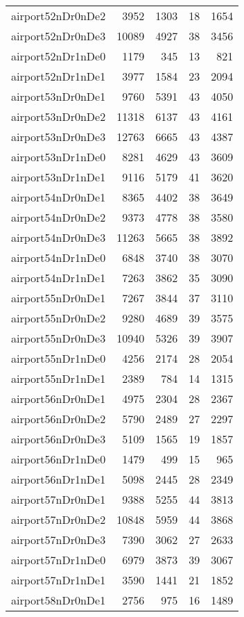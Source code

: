 \documentclass[../../../thesis.tex]{subfiles}
\begin{document}
\begin{longtable}{lrrrr}
airport52nDr0nDe2 & 3952 & 1303 & 18 & 1654 \\
airport52nDr0nDe3 & 10089 & 4927 & 38 & 3456 \\
airport52nDr1nDe0 & 1179 & 345 & 13 & 821 \\
airport52nDr1nDe1 & 3977 & 1584 & 23 & 2094 \\
airport53nDr0nDe1 & 9760 & 5391 & 43 & 4050 \\
airport53nDr0nDe2 & 11318 & 6137 & 43 & 4161 \\
airport53nDr0nDe3 & 12763 & 6665 & 43 & 4387 \\
airport53nDr1nDe0 & 8281 & 4629 & 43 & 3609 \\
airport53nDr1nDe1 & 9116 & 5179 & 41 & 3620 \\
airport54nDr0nDe1 & 8365 & 4402 & 38 & 3649 \\
airport54nDr0nDe2 & 9373 & 4778 & 38 & 3580 \\
airport54nDr0nDe3 & 11263 & 5665 & 38 & 3892 \\
airport54nDr1nDe0 & 6848 & 3740 & 38 & 3070 \\
airport54nDr1nDe1 & 7263 & 3862 & 35 & 3090 \\
airport55nDr0nDe1 & 7267 & 3844 & 37 & 3110 \\
airport55nDr0nDe2 & 9280 & 4689 & 39 & 3575 \\
airport55nDr0nDe3 & 10940 & 5326 & 39 & 3907 \\
airport55nDr1nDe0 & 4256 & 2174 & 28 & 2054 \\
airport55nDr1nDe1 & 2389 & 784 & 14 & 1315 \\
airport56nDr0nDe1 & 4975 & 2304 & 28 & 2367 \\
airport56nDr0nDe2 & 5790 & 2489 & 27 & 2297 \\
airport56nDr0nDe3 & 5109 & 1565 & 19 & 1857 \\
airport56nDr1nDe0 & 1479 & 499 & 15 & 965 \\
airport56nDr1nDe1 & 5098 & 2445 & 28 & 2349 \\
airport57nDr0nDe1 & 9388 & 5255 & 44 & 3813 \\
airport57nDr0nDe2 & 10848 & 5959 & 44 & 3868 \\
airport57nDr0nDe3 & 7390 & 3062 & 27 & 2633 \\
airport57nDr1nDe0 & 6979 & 3873 & 39 & 3067 \\
airport57nDr1nDe1 & 3590 & 1441 & 21 & 1852 \\
airport58nDr0nDe1 & 2756 & 975 & 16 & 1489 \\

\end{longtable}
\end{document}
